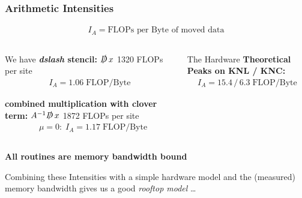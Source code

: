 \documentclass{beamer}
\begin{document}
  \begin{frame}
    \frametitle{Arithmetic Intensities}
    \vspace{-5mm}
    \footnotesize

    \begin{align*}
      I_A = \textrm{FLOPs per Byte of moved data}
    \end{align*}

    \begin{columns}[t]
        

    \begin{column}{0.49\linewidth}
      \begin{block}{We have}
      \textbf{\textit{dslash} stencil:} \; $\slashed D \,x$ \hfill 1320 FLOPs per site
      \begin{align*}
        I_A = 1.06 \; \textrm{FLOP/Byte}
      \end{align*}

      \textbf{combined multiplication with clover term:} \; $A^{-1}  \slashed D \, x$ \hfill 1872 FLOPs per site
      \begin{align*}
        &\mu = 0: \; I_A = 1.17 \; \textrm{FLOP/Byte}
      \end{align*}
      \end{block}
    \end{column}

    \hfill
    \begin{column}{0.49\linewidth}
      \begin{block}{The Hardware}
      \textbf{Theoretical Peaks on KNL / KNC:}
      \begin{align*}
        I_A = 15.4 \, / \, 6.3 \; \textrm{FLOP/Byte}
      \end{align*}
      \vfill
      \end{block}
    \end{column}
    \end{columns}

    \vfill

      {
        \large
      \centering \textbf{All routines are memory bandwidth bound}\\
    }


      Combining these Intensities with a simple hardware model and the (measured) memory bandwidth
      gives us a good \textit{rooftop model} \dots

  \end{frame}

\end{document}
